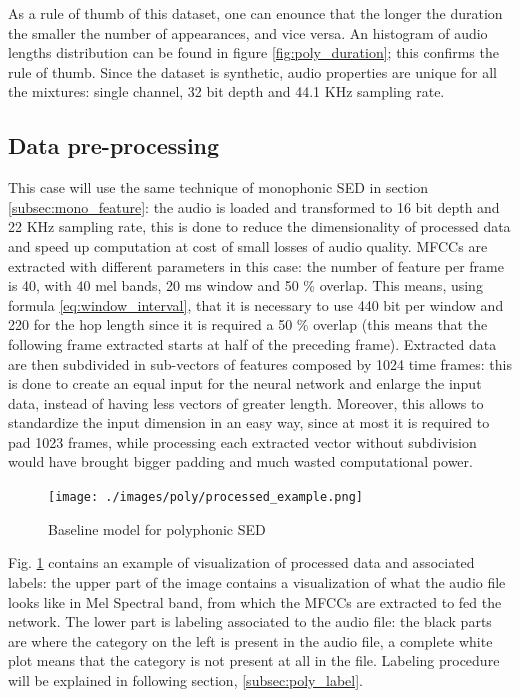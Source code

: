 \documentclass{article}
\begin{document}
As a rule of thumb of this dataset, one can enounce that the longer the duration the smaller the number of appearances, and vice versa. An histogram of audio lengths distribution can be found in figure \ref{fig:poly_duration}; this confirms the rule of thumb.\newline
Since the dataset is synthetic, audio properties are unique for all the mixtures: single channel, 32 bit depth and 44.1 KHz sampling rate.

\subsection{Data pre-processing}
\label{subsec:poly_feature}

This case will use the same technique of monophonic SED in section \ref{subsec:mono_feature}: the audio is loaded and transformed to 16 bit depth and 22 KHz sampling rate, this is done to reduce the dimensionality of processed data and speed up computation at cost of small losses of audio quality.\newline
MFCCs are extracted with different parameters in this case: the number of feature per frame is 40, with 40 mel bands, 20 ms window and 50 \% overlap. This means, using formula \ref{eq:window_interval}, that it is necessary to use 440 bit per window and 220 for the hop length since it is required a 50 \% overlap (this means that the following frame extracted starts at half of the preceding frame).\newline
Extracted data are then subdivided in sub-vectors of features composed by 1024 time frames: this is done to create an equal input for the neural network and enlarge the input data, instead of having less vectors of greater length. Moreover, this allows to standardize the input dimension in an easy way, since at most it is required to pad 1023 frames, while processing each extracted vector without subdivision would have brought bigger padding and much wasted computational power.

\begin{figure}[H]
	\centering
	\texttt{[image: ./images/poly/processed\_example.png]}	
	\caption{Baseline model for polyphonic SED}
	\label{fig:poly_processed}
\end{figure}

Fig. \ref{fig:poly_processed} contains an example of visualization of processed data and associated labels: the upper part of the image contains a visualization of what the audio file looks like in Mel Spectral band, from which the MFCCs are extracted to fed the network. The lower part is labeling associated to the audio file: the black parts are where the category on the left is present in the audio file, a complete white plot means that the category is not present at all in the file. Labeling procedure will be explained in following section, \ref{subsec:poly_label}.
\end{document}
